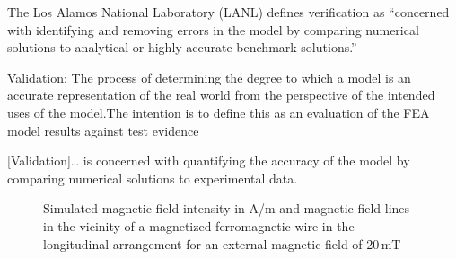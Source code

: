 The Los Alamos National Laboratory (LANL) defines verification as “concerned with identifying and removing errors in the model by comparing numerical solutions to analytical or highly accurate benchmark solutions.”

Validation: The process of determining the degree to which a model is an accurate representation of the real world from the perspective of the intended uses of the model.The intention is to define this as an evaluation of the FEA model results against test evidence

[Validation]… is concerned with quantifying the accuracy of the model by comparing numerical solutions to experimental data.

\begin{figure}[h]
\centering

\caption[Simulated magnetic field intensity around a single wire]{Simulated magnetic field intensity in A/m and magnetic field lines in the vicinity of a magnetized ferromagnetic wire in the longitudinal arrangement for an external magnetic field of 20\,mT 
\label{fig:Hfield_sw}
}
\end{figure}



